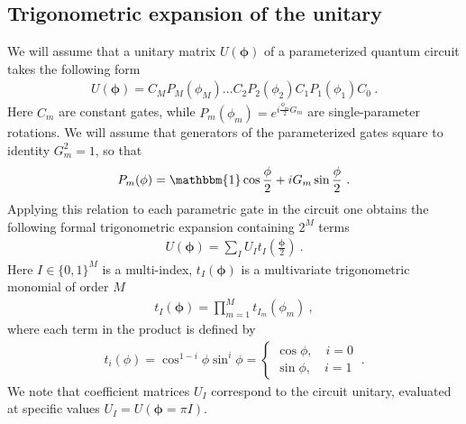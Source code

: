 \documentclass[twocolumn, amsfonts, amssymb, aps, nofootinbib]{revtex4-2}
\begin{document}
\subsection{Trigonometric expansion of the unitary}
We will assume that a unitary matrix $U(\pmb{\phi})$ of a parameterized quantum circuit takes the following form 
\begin{align}
	U(\pmb{\phi})=C_M P_M(\phi_M)\dots C_2P_2(\phi_2)C_1 P_1(\phi_1) C_0 \ . \label{U phi}
\end{align}
Here $C_m$ are constant gates, while $P_m(\phi_m)=e^{i\frac{\phi_m}{2} G_m}$ are single-parameter rotations. We will assume that generators of the parameterized gates square to identity $G_m^2=1$, so that
\begin{align}
	P_m(\phi)=\mathbbm{1}\cos\frac{\phi}{2}+iG_m\sin\frac{\phi}{2} \ .
\end{align}
Applying this relation to each parametric gate in the circuit one obtains the following formal trigonometric expansion containing $2^M$ terms
\begin{align}
	U(\pmb{\phi})=\sum_I U_I t_I\left(\frac{\pmb{\phi}}2\right) \ . \label{U expansion}
\end{align}
Here $I\in\{0,1\}^M$ is a multi-index, $t_I(\pmb{\phi})$ is a multivariate trigonometric monomial of order $M$
\begin{align}
	t_I(\pmb{\phi})=\prod_{m=1}^M t_{I_m}(\phi_m) \label{t def} \ ,
\end{align}
where each term in the product is defined by
\begin{align}
	t_i(\phi)=\cos^{1-i}\phi\sin^i\phi=\begin{cases}\cos\phi,\quad i=0\\\sin\phi,\quad i=1\end{cases} \ .
\end{align}
We note that coefficient matrices $U_I$ correspond to the circuit unitary, evaluated at specific values $U_I=U(\pmb{\phi}=\pi I)$.
\end{document}
